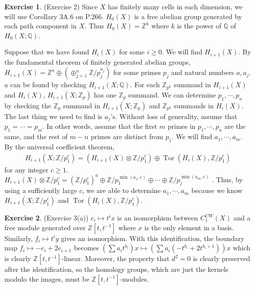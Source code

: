 \documentclass[12pt, psamsfonts]{amsart}
\theoremstyle{definition}
\newtheorem*{exer}{Exercise}
\theoremstyle{remark}
\DeclareMathOperator{\Tor}{Tor}
\numberwithin{equation}{section}
\begin{document}
\begin{exer}{(Exercise 2)}
  Since $X$ has finitely many cells in each dimension, we will use Corollary 3A.6 on P.266.
  $H_0(X)$ is a free abelian group generated by each path component in $X$.
  Thus $H_0(X) = \mathbb{Z}^k$ where $k$ is the power of $\mathbb{Q}$ of $H_0(X; \mathbb{Q})$.

  Suppose that we have found $H_i(X)$ for some $i \geq 0$.
  We will find $H_{i + 1}(X)$.
  By the fundamental theorem of finitely generated abelian groups, $H_{i + 1}(X) = \mathbb{Z}^a \oplus (\oplus_{j=1}^{n} \mathbb{Z} / p_j^{a_j})$ for some primes $p_j$ and natural numbers $a, a_j$.
  $a$ can be found by checking $H_{i + 1}(X; \mathbb{Q})$.
  For each $\mathbb{Z}_{p^k}$ summand in $H_{i + 1}(X)$ and $H_{i}(X)$, $H_{i + 1}(X; \mathbb{Z}_p)$ has one $\mathbb{Z}_p$ summand.
  We can determine $p_1, \cdots, p_n$ by checking the $\mathbb{Z}_p$ summand in $H_{i + 1}(X; \mathbb{Z}_p)$ and $\mathbb{Z}_{p^k}$ summands in $H_i(X)$.
  The last thing we need to find is $a_j$'s.
  Without loss of generality, assume that $p_1 = \cdots = p_m$.
  In other words, assume that the first $m$ primes in $p_1, \cdots, p_n$ are the same, and the rest of $m - n$ primes are distinct from $p_1$.
  We will find $a_1, \cdots, a_m$.
  By the universal coefficient theorem,
  \begin{align*}
    H_{i + 1}(X; \mathbb{Z} / p_1^c) = (H_{i + 1}(X) \otimes \mathbb{Z} / p_1^c) \oplus \Tor(H_i(X), \mathbb{Z} / p_1^c)
  \end{align*}
  for any integer $c \geq 1$.
  $H_{i + 1}(X) \otimes \mathbb{Z} / p_1^c = (\mathbb{Z} / p_1^c)^a \oplus \mathbb{Z} / p_1^{\min(a_1, c)} \oplus \cdots \oplus \mathbb{Z} / p_j^{\min(a_m, c)}$ .
  Thus, by using a sufficiently large $c$, we are able to determine $a_1, \cdots, a_m$ because we know $H_{i + 1}(X; \mathbb{Z} / p_1^c)$ and $\Tor(H_i(X), \mathbb{Z} / p_1^c)$.

\end{exer}

\begin{exer}{(Exercise 3(a))}
  $e_i \mapsto t^ix$ is an isomorphism between $C_1^{CW}(X)$ and a free module generated over $\mathbb{Z}[t, t^{-1}]$ where $x$ is the only element in a basis.
  Similarly, $f_i \mapsto t^iy$ gives an isomorphism.
  With this identification, the boundary map $f_i \mapsto -e_i + 2e_{i + 1}$ becomes $(\sum a_it^{b_i}) x \mapsto (\sum a_i(-t^{b_i} + 2t^{b_i + 1}))x$ which is clearly $\mathbb{Z}[t, t^{-1}]$-linear.
  Moreover, the property that $d^2 = 0$ is clearly preserved after the identification, so the homology groups, which are just the kernels modulo the images, must be $\mathbb{Z}[t, t^{-1}]$-modules.
\end{exer}
\end{document}
